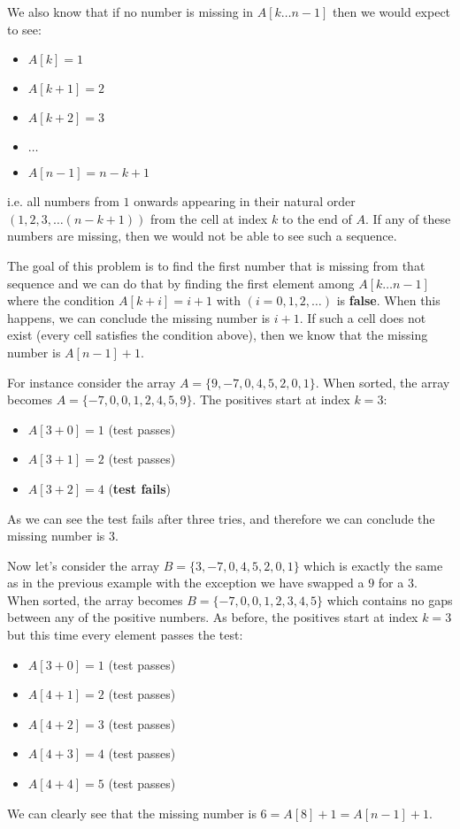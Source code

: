 We also know that if no number is missing in $A[k \ldots n-1]$ then we would expect to see: 
\begin{itemize}
	\item $A[k]=1$
	\item $A[k+1]=2$
	\item $A[k+2]=3$
	\item $\ldots$
	\item $A[n-1]=n-k+1$
\end{itemize}


i.e. all numbers from $1$ onwards appearing in their natural order $(1,2,3, \ldots (n-k+1))$ from the cell at index $k$ to the end of $A$. 
If any of these numbers are missing, then we would not be able to see such a sequence.

The goal of this problem is to find the first number that is missing from that sequence and we can do that by finding the first element among $A[k \ldots n-1]$  where the condition $A[k+i]=i+1$ with $(i=0,1,2, \ldots)$ is \textbf{false}. When this happens, we can conclude the missing number is $i+1$.
If such a cell does not exist (every cell satisfies the condition above), then we know that the missing number is $A[n-1]+1$.

For instance consider the array $A=\{ 9,-7,0,4,5,2,0,1\}$. When sorted, the array
becomes $A=\{ -7,0,0,1,2,4,5,9\}$. The positives start at index $k=3$:
\begin{itemize}
	\item $A[3+0] = 1$ (test passes)
	\item $A[3+1] = 2$ (test passes)
	\item $A[3+2] = 4$ (\textbf{test fails})
\end{itemize}
As we can see the test fails after three tries, and therefore we can conclude the missing number is $3$.


Now let's consider the array $B=\{ 3,-7,0,4,5,2,0,1\}$ which is exactly the same as in the previous example with the exception we have swapped a $9$ for a $3$. When sorted, the array
becomes $B=\{ -7,0,0,1,2,3,4,5\}$ which contains no gaps between any of the positive numbers. As before, the positives start at index $k=3$ but this time every element passes the test:
\begin{itemize}
	\item $A[3+0] = 1$ (test passes)
	\item $A[4+1] = 2$ (test passes)
	\item $A[4+2] = 3$ (test passes)
	\item $A[4+3] = 4$ (test passes)
	\item $A[4+4] = 5$ (test passes)
\end{itemize}
We can clearly see that the missing number is $6 = A[8]+1 = A[n-1]+1$.




